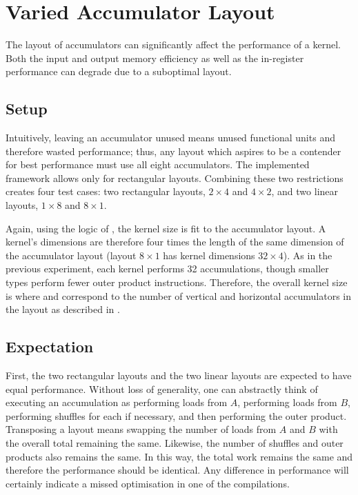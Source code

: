 \documentclass[\main/thesis.tex]{subfiles}
\begin{document}
\section{Varied Accumulator Layout}
The layout of accumulators can significantly affect the performance of a kernel.
Both the input and output memory efficiency as well as the in-register performance can degrade due to a suboptimal layout.

\subsection{Setup}
Intuitively, leaving an accumulator unused means unused functional units and therefore wasted performance; thus, any layout which aspires to be a contender for best performance must use all eight accumulators.
The implemented framework allows only for rectangular layouts.
Combining these two restrictions creates four test cases: two rectangular layouts, $2 \times 4$ and $4 \times 2$, and two linear layouts, $1 \times 8$ and $8 \times 1$.

Again, using the logic of , the kernel size is fit to the accumulator layout.
A kernel's dimensions are therefore four times the length of the same dimension of the accumulator layout (\eg layout $8 \times 1$ has kernel dimensions $32 \times 4$).
As in the previous experiment, each kernel performs 32 accumulations, though smaller types perform fewer outer product instructions.
Therefore, the overall kernel size is  where  and  correspond to the number of vertical and horizontal accumulators in the layout as described in .

\subsection{Expectation}
First, the two rectangular layouts and the two linear layouts are expected to have equal performance.
Without loss of generality, one can abstractly think of executing an accumulation as performing loads from $A$, performing loads from $B$, performing shuffles for each if necessary, and then performing the outer product.
Transposing a layout means swapping the number of loads from $A$ and $B$ with the overall total remaining the same.
Likewise, the number of shuffles and outer products also remains the same.
In this way, the total work remains the same and therefore the performance should be identical.
Any difference in performance will certainly indicate a missed optimisation in one of the compilations.
\end{document}
